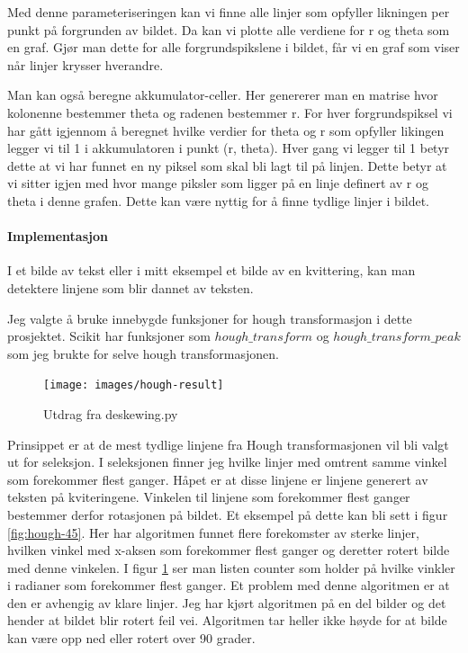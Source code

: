 \documentclass{article}
\begin{document}
Med denne parameteriseringen kan vi finne alle linjer som opfyller likningen per punkt på forgrunden av bildet. Da kan vi plotte alle verdiene for r og theta som en graf. Gjør man dette for alle forgrundspikslene i bildet, får vi en graf som viser når linjer krysser hverandre.

Man kan også beregne akkumulator-celler. Her genererer man en matrise hvor kolonenne bestemmer theta og radenen bestemmer r. For hver forgrundspiksel vi har gått igjennom å beregnet hvilke verdier for theta og r som opfyller likingen legger vi til 1 i akkumulatoren i punkt (r, theta). Hver gang vi legger til 1 betyr dette at vi har funnet en ny piksel som skal bli lagt til på linjen. Dette betyr at vi sitter igjen med hvor mange piksler som ligger på en linje definert av r og theta i denne grafen. Dette kan være nyttig for å finne tydlige linjer i bildet.

\paragraph{Implementasjon}
I et bilde av tekst eller i mitt eksempel et bilde av en kvittering, kan man detektere linjene som blir dannet av teksten.

Jeg valgte å bruke innebygde funksjoner for hough transformasjon i dette prosjektet. Scikit har funksjoner som $hough\_transform$ og $hough\_transform\_peak$ som jeg brukte for selve hough transformasjonen.

\begin{figure}[h]
\centering
\texttt{[image: images/hough-result]}
\caption{Utdrag fra deskewing.py}
\label{fig:hough-result}
\end{figure}

Prinsippet er at de mest tydlige linjene fra Hough transformasjonen vil bli valgt ut for seleksjon. I seleksjonen finner jeg hvilke linjer med omtrent samme vinkel som forekommer flest ganger. Håpet er at disse linjene er linjene generert av teksten på kviteringene. Vinkelen til linjene som forekommer flest ganger bestemmer derfor rotasjonen på bildet. Et eksempel på dette kan bli sett i figur \ref{fig:hough-45}. Her har algoritmen funnet flere forekomster av sterke linjer, hvilken vinkel med x-aksen som forekommer flest ganger og deretter rotert bilde med denne vinkelen. I figur \ref{fig:hough-result} ser man listen counter som holder på hvilke vinkler i radianer som forekommer flest ganger. Et problem med denne algoritmen er at den er avhengig av klare linjer. Jeg har kjørt algoritmen på en del bilder og det hender at bildet blir rotert feil vei. Algoritmen tar heller ikke høyde for at bilde kan være opp ned eller rotert over 90 grader.
\end{document}
